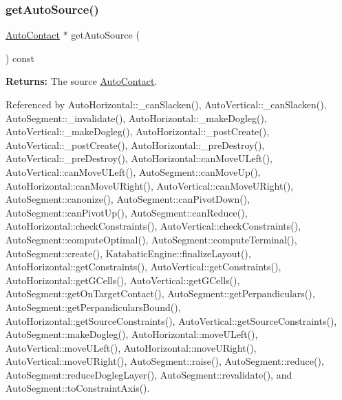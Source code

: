 \mbox{\label{classKatabatic_1_1AutoSegment_a2ca3fac97e325ec8a55d3e03a2ce11a6}} 
\subsubsection{\texorpdfstring{get\+Auto\+Source()}{getAutoSource()}}
{\footnotesize\ttfamily \hyperlink{classKatabatic_1_1AutoContact}{Auto\+Contact} $\ast$ get\+Auto\+Source (\begin{DoxyParamCaption}{ }\end{DoxyParamCaption}) const\hspace{0.3cm}{\ttfamily [inline]}}

{\bfseries Returns\+:} The source \hyperlink{classKatabatic_1_1AutoContact}{Auto\+Contact}. 

Referenced by Auto\+Horizontal\+::\+\_\+can\+Slacken(), Auto\+Vertical\+::\+\_\+can\+Slacken(), Auto\+Segment\+::\+\_\+invalidate(), Auto\+Horizontal\+::\+\_\+make\+Dogleg(), Auto\+Vertical\+::\+\_\+make\+Dogleg(), Auto\+Horizontal\+::\+\_\+post\+Create(), Auto\+Vertical\+::\+\_\+post\+Create(), Auto\+Horizontal\+::\+\_\+pre\+Destroy(), Auto\+Vertical\+::\+\_\+pre\+Destroy(), Auto\+Horizontal\+::can\+Move\+U\+Left(), Auto\+Vertical\+::can\+Move\+U\+Left(), Auto\+Segment\+::can\+Move\+Up(), Auto\+Horizontal\+::can\+Move\+U\+Right(), Auto\+Vertical\+::can\+Move\+U\+Right(), Auto\+Segment\+::canonize(), Auto\+Segment\+::can\+Pivot\+Down(), Auto\+Segment\+::can\+Pivot\+Up(), Auto\+Segment\+::can\+Reduce(), Auto\+Horizontal\+::check\+Constraints(), Auto\+Vertical\+::check\+Constraints(), Auto\+Segment\+::compute\+Optimal(), Auto\+Segment\+::compute\+Terminal(), Auto\+Segment\+::create(), Katabatic\+Engine\+::finalize\+Layout(), Auto\+Horizontal\+::get\+Constraints(), Auto\+Vertical\+::get\+Constraints(), Auto\+Horizontal\+::get\+G\+Cells(), Auto\+Vertical\+::get\+G\+Cells(), Auto\+Segment\+::get\+On\+Target\+Contact(), Auto\+Segment\+::get\+Perpandiculars(), Auto\+Segment\+::get\+Perpandiculars\+Bound(), Auto\+Horizontal\+::get\+Source\+Constraints(), Auto\+Vertical\+::get\+Source\+Constraints(), Auto\+Segment\+::make\+Dogleg(), Auto\+Horizontal\+::move\+U\+Left(), Auto\+Vertical\+::move\+U\+Left(), Auto\+Horizontal\+::move\+U\+Right(), Auto\+Vertical\+::move\+U\+Right(), Auto\+Segment\+::raise(), Auto\+Segment\+::reduce(), Auto\+Segment\+::reduce\+Dogleg\+Layer(), Auto\+Segment\+::revalidate(), and Auto\+Segment\+::to\+Constraint\+Axis().

